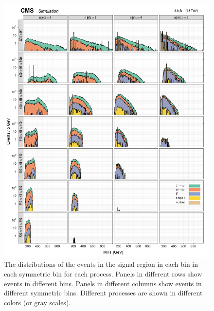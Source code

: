 \begin{figure}[!h]
\centering
\includegraphics[scale=0.95]{figures/kiplots/c150107_s150318_f015_MHT_100}
\caption{The \mht distributions of the events in the signal region in
each \scalht bin in each symmetric \njet bin for each process. Panels
in different rows show events in different \scalht bins. Panels in
different columns show events in different symmetric \njet bins.
Different processes are shown in different colors (or gray scales).}
\label{c150107_s150318_f015_MHT_100}
\end{figure}


